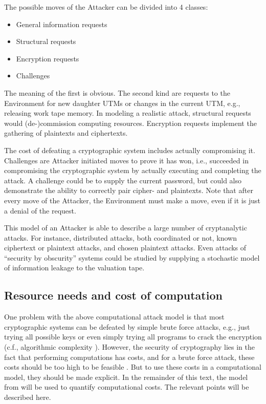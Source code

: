\documentclass{article}
\begin{document}
The possible moves of the Attacker can be divided into 4 classes: 
\begin{itemize}
\item General information requests
\item Structural requests
\item Encryption requests
\item Challenges
\end{itemize}
The meaning of the first is obvious. The second kind are requests to the Environment for 
new daughter UTMs or changes in the current UTM, e.g., releasing work tape memory.
In modeling a realistic attack, structural requests would (de-)commission computing resources.
Encryption requests implement the gathering of plaintexts and ciphertexts.

The cost of defeating a cryptographic system includes actually compromising it.
Challenges are Attacker initiated moves to prove it has won, i.e.,
succeeded in compromising the cryptographic system by actually executing and completing
the attack. A challenge could be to supply the current password, but could also 
demonstrate the ability to correctly pair cipher-
and plaintexts. Note that after every move of the Attacker, the Environment must make
a move, even if it is just a denial of the request.

This model of an Attacker is able to describe a large number of cryptanalytic
attacks. For instance, distributed attacks, both coordinated or not, known
ciphertext or plaintext attacks, and chosen plaintext attacks. Even attacks of
``security by obscurity'' systems could be studied by supplying a stochastic model
of information leakage to the valuation tape.

\subsection{Resource needs and cost of computation}\label{SectRequirements}

One problem with the above computational attack model is that most cryptographic
systems can be defeated by simple brute force attacks, e.g., just trying all
possible keys \cite{Shannon1949} or even simply trying all programs to crack
the encryption (c.f., algorithmic complexity \cite{LiVitanyi261084}). 
However, the security of cryptography
lies in the fact that performing computations has costs, and for a brute force
attack, these costs should be too high to be feasible \cite{Shannon1949}. But to
use these costs in a computational model, they should be made explicit.
In the remainder of this text, the model from \cite{Son0911-5262} will be
used to quantify computational costs. The relevant points will be described here.
\end{document}
